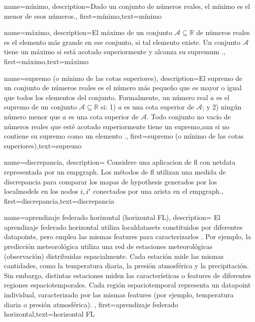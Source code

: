 
{
	name=mínimo,
	description={Dado un conjunto de números reales, el mínimo es el menor de esos números.},
	first={mínimo},text={mínimo}
}


{name=máximo,
     description={El máximo de un conjunto $\mathcal{A} \subseteq \mathbb{R}$ 
	 de números reales es el elemento más grande en ese conjunto, si tal elemento existe. Un conjunto $\mathcal{A}$ 
	 tiene un máximo si está acotado superiormente y alcanza su \gls{supremum} \cite[Sec.~1.4]{RudinBookPrinciplesMatheAnalysis}.},
 first={máximo},text={máximo}
}

{name=supremo (o mínimo de las cotas superiores),
	description={El supremo de un conjunto de números reales es 
		el número más pequeño que es mayor o igual que todos los elementos del conjunto. Formalmente, un número real 
		$a$ es el supremo de un conjunto $\mathcal{A} \subseteq \mathbb{R}$ si: 1) $a$ 
		es una cota superior de $\mathcal{A}$; y 2) ningún número menor que $a$ es una cota superior de $\mathcal{A}$. 
		Todo conjunto no vacío de números reales que esté acotado superiormente tiene un supremo,aun si no contiene su supremo como un elemento \cite[Sec.~1.4]{RudinBookPrinciplesMatheAnalysis}.},
	first={supremo (o mínimo de las cotas superiores)},text={supremo}
}

{name=discrepancia,
	description={
		Considere una aplicacion de  \gls{fl} con \gls{netdata} 
		representada por un \gls{empgraph}. Los métodos de \gls{fl} utilizan una medida de discrepancia para  
		comparar los mapas  de \gls{hypothesis} generados por los  \gls{localmodel}s en los nodos $i,i'$ 
		conectados por una arista en el \gls{empgraph}.},
	first={discrepancia},text={discrepancia}
}



{name={aprendizaje federado horizontal (horizontal FL)},
	description={
		El aprendizaje federado horizontal utiliza \gls{localdataset}s constituidos por diferentes
		\gls{datapoint}s, pero emplea las mismas \gls{feature}s para caracterizarlos \cite{HFLChapter2020}.
		Por ejemplo, la predicción meteorológica utiliza una red de estaciones meteorológicas
		(observación) distribuidas espacialmente. Cada estación mide las mismas cantidades, como
		la temperatura diaria, la presión atmosférica y la precipitación. Sin embargo,
		distintas estaciones miden las características o \gls{feature}s de diferentes regiones espaciotemporales.
		Cada región espaciotemporal representa un \gls{datapoint} individual, caracterizado por las mismas \gls{feature}s
		(por ejemplo, temperatura diaria o presión atmosférica).
	},
	first={aprendizaje federado horizontal},text={horizontal FL}
}

